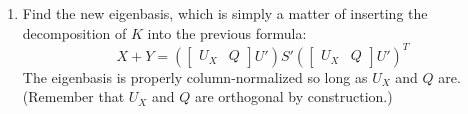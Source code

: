 \documentclass[english]{article}
\begin{document}
\begin{enumerate}
\item Find the new eigenbasis, which is simply a matter of inserting the decomposition of $K$ into the previous formula:
\begin{equation} \label{result} X + Y = \left(\left[\begin{array}{cc} U_X & Q\end{array}\right] U'\right) S' \left(\left[\begin{array}{cc} U_X & Q\end{array}\right] U'\right)^T \end{equation}
The eigenbasis is properly column-normalized so long as $U_X$ and $Q$ are.  (Remember that $U_X$ and $Q$ are orthogonal by construction.)

\end{enumerate}
\end{document}

